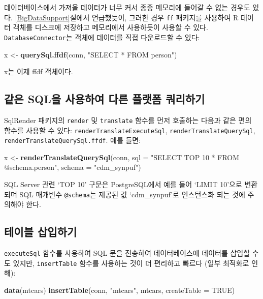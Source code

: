 \documentclass[10.5pt]{book}
\newenvironment{Shaded}{\begin{snugshade}}{\end{snugshade}}
\newcommand{\KeywordTok}[1]{\textcolor[rgb]{0.13,0.29,0.53}{\textbf{#1}}}
\newcommand{\DataTypeTok}[1]{\textcolor[rgb]{0.13,0.29,0.53}{#1}}
\newcommand{\StringTok}[1]{\textcolor[rgb]{0.31,0.60,0.02}{#1}}
\newcommand{\OtherTok}[1]{\textcolor[rgb]{0.56,0.35,0.01}{#1}}
\newcommand{\NormalTok}[1]{#1}
\theoremstyle{definition}
\theoremstyle{definition}
\theoremstyle{definition}
\theoremstyle{remark}
\begin{document}
데이터베이스에서 가져올 데이터가 너무 커서 종종 메모리에 들어갈 수 없는
경우도 있다. \ref{BigDataSupport}절에서 언급했듯이, 그러한 경우
\texttt{ff} 패키지를 사용하여 R 데이터 객체를 디스크에 저장하고
메모리에서 사용하듯이 사용할 수 있다. \texttt{DatabaseConnector}는
객체에 데이터를 직접 다운로드할 수 있다:

\begin{Shaded}
\begin{Highlighting}[]
\NormalTok{x <-}\StringTok{ }\KeywordTok{querySql.ffdf}\NormalTok{(conn, }\StringTok{"SELECT * FROM person"}\NormalTok{)}
\end{Highlighting}
\end{Shaded}

x는 이제 ffdf 객체이다.

\subsection{같은 SQL을 사용하여 다른 플랫폼 쿼리하기}\label{-sql----}

SqlRender 패키지의 \texttt{render} 및 \texttt{translate} 함수를 먼저
호출하는 다음과 같은 편의 함수를 사용할 수 있다:
\texttt{renderTranslateExecuteSql}, \texttt{renderTranslateQuerySql},
\texttt{renderTranslateQuerySql.ffdf}. 예를 들면:

\begin{Shaded}
\begin{Highlighting}[]
\NormalTok{x <-}\StringTok{ }\KeywordTok{renderTranslateQuerySql}\NormalTok{(conn,}
                             \DataTypeTok{sql =} \StringTok{"SELECT TOP 10 * FROM @schema.person"}\NormalTok{,}
                             \DataTypeTok{schema =} \StringTok{"cdm_synpuf"}\NormalTok{)}
\end{Highlighting}
\end{Shaded}

SQL Server 관련 `TOP 10' 구문은 PostgreSQL에서 예를 들어 `LIMIT 10'으로
변환되며 SQL 매개변수 \texttt{@schema}는 제공된 값 `cdm\_synpuf'로
인스턴스화 되는 것에 주의해야 한다.

\subsection{테이블 삽입하기}\label{-}

\texttt{executeSql} 함수를 사용하여 SQL 문을 전송하여 데이터베이스에
데이터를 삽입할 수도 있지만, \texttt{insertTable} 함수를 사용하는 것이
더 편리하고 빠르다 (일부 최적화로 인해):

\begin{Shaded}
\begin{Highlighting}[]
\KeywordTok{data}\NormalTok{(mtcars)}
\KeywordTok{insertTable}\NormalTok{(conn, }\StringTok{"mtcars"}\NormalTok{, mtcars, }\DataTypeTok{createTable =} \OtherTok{TRUE}\NormalTok{)}
\end{Highlighting}
\end{Shaded}
\end{document}
